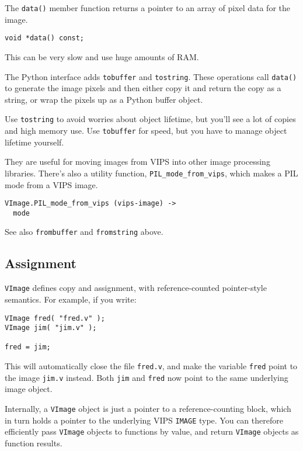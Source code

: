The \verb+data()+ member function returns a pointer to an array of pixel data
for the image. 

\begin{verbatim}
void *data() const;
\end{verbatim}

\noindent
This can be very slow and use huge amounts of RAM.

The Python interface adds \verb+tobuffer+ and \verb+tostring+. These
operations call \verb+data()+ to generate the image pixels and then either
copy it and return the copy as a string, or wrap the pixels up as a Python
buffer object.

Use \verb+tostring+ to avoid worries about object lifetime, but you'll see a
lot of copies and high memory use. Use \verb+tobuffer+ for speed, but you
have to manage object lifetime yourself.

They are useful for moving images from VIPS into other image processing
libraries. There's also a utility function, \verb+PIL_mode_from_vips+, which
makes a PIL mode from a VIPS image.

\begin{verbatim}
VImage.PIL_mode_from_vips (vips-image) -> 
  mode
\end{verbatim}

See also \verb+frombuffer+ and \verb+fromstring+ above.

\subsection{Assignment}

\verb+VImage+ defines copy and assignment, with reference-counted
pointer-style semantics.  For example, if you write:

\begin{verbatim}
VImage fred( "fred.v" );
VImage jim( "jim.v" );

fred = jim;
\end{verbatim}

This will automatically close the file \verb+fred.v+, and make the variable
\verb+fred+ point to the image \verb+jim.v+ instead. Both \verb+jim+ and
\verb+fred+ now point to the same underlying image object. 

Internally, a \verb+VImage+ object is just a pointer to a reference-counting
block, which in turn holds a pointer to the underlying VIPS \verb+IMAGE+ type.
You can therefore efficiently pass \verb+VImage+ objects to functions by
value, and return \verb+VImage+ objects as function results.

